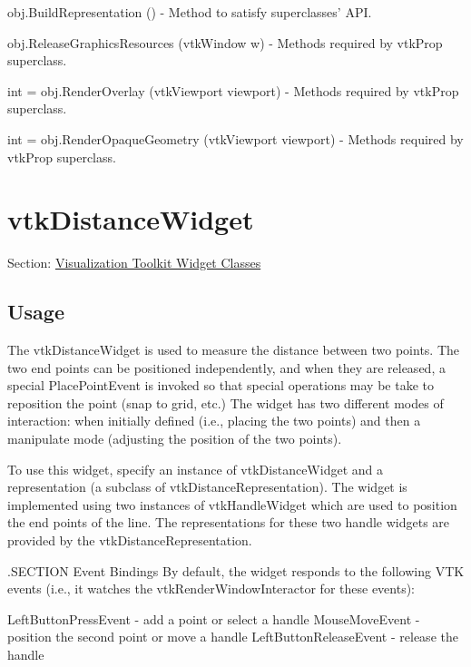 \begin{DoxyItemize}
\item {\ttfamily obj.\-Build\-Representation ()} -\/ Method to satisfy superclasses' A\-P\-I.  
\item {\ttfamily obj.\-Release\-Graphics\-Resources (vtk\-Window w)} -\/ Methods required by vtk\-Prop superclass.  
\item {\ttfamily int = obj.\-Render\-Overlay (vtk\-Viewport viewport)} -\/ Methods required by vtk\-Prop superclass.  
\item {\ttfamily int = obj.\-Render\-Opaque\-Geometry (vtk\-Viewport viewport)} -\/ Methods required by vtk\-Prop superclass.  
\end{DoxyItemize}\hypertarget{vtkwidgets_vtkdistancewidget}{}\section{vtk\-Distance\-Widget}\label{vtkwidgets_vtkdistancewidget}
Section\-: \hyperlink{sec_vtkwidgets}{Visualization Toolkit Widget Classes} \hypertarget{vtkwidgets_vtkxyplotwidget_Usage}{}\subsection{Usage}\label{vtkwidgets_vtkxyplotwidget_Usage}
The vtk\-Distance\-Widget is used to measure the distance between two points. The two end points can be positioned independently, and when they are released, a special Place\-Point\-Event is invoked so that special operations may be take to reposition the point (snap to grid, etc.) The widget has two different modes of interaction\-: when initially defined (i.\-e., placing the two points) and then a manipulate mode (adjusting the position of the two points).

To use this widget, specify an instance of vtk\-Distance\-Widget and a representation (a subclass of vtk\-Distance\-Representation). The widget is implemented using two instances of vtk\-Handle\-Widget which are used to position the end points of the line. The representations for these two handle widgets are provided by the vtk\-Distance\-Representation.

.S\-E\-C\-T\-I\-O\-N Event Bindings By default, the widget responds to the following V\-T\-K events (i.\-e., it watches the vtk\-Render\-Window\-Interactor for these events)\-: 
\begin{DoxyPre}
   LeftButtonPressEvent - add a point or select a handle
   MouseMoveEvent - position the second point or move a handle
   LeftButtonReleaseEvent - release the handle
 \end{DoxyPre}


